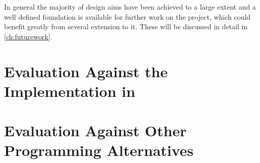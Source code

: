 In general the majority of design aims have been achieved to a large extent and a well defined foundation is available for further work on the project, which could benefit greatly from several extension to it. These will be discussed in detail in \autoref{ch:futurework}.


\section{Evaluation Against the Implementation in \cite{sess_type_guided_distr_interact}}


\section{Evaluation Against Other Programming Alternatives}